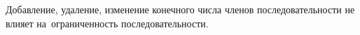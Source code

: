 
        Добавление, удаление, изменение конечного числа членов последовательности не влияет на~ограниченность последовательности.
    